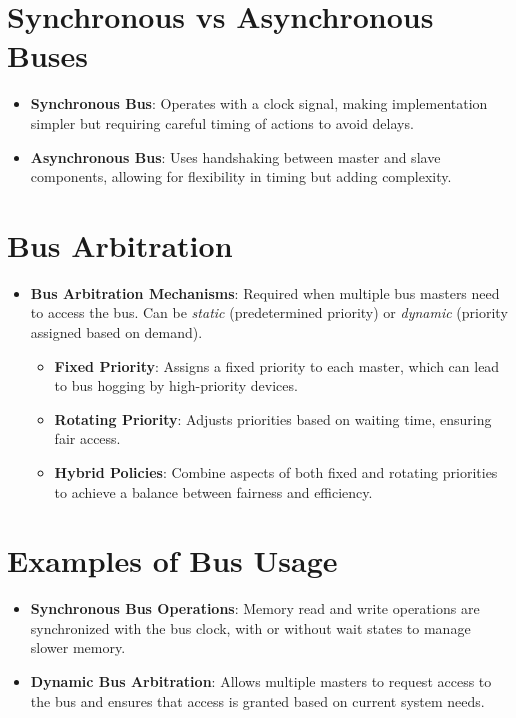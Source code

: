 \documentclass[
  14pt,
  a4paper,
  DIV=11,
  numbers=noendperiod,
  headinclude=true,
  footinclude=true]{scrreprt}
\providecommand{\tightlist}{%
  \setlength{\itemsep}{0pt}\setlength{\parskip}{0pt}}\usepackage{longtable,booktabs,array}
\begin{document}
\section{Synchronous vs Asynchronous
Buses}\label{synchronous-vs-asynchronous-buses}

\begin{itemize}
\tightlist
\item
  \textbf{Synchronous Bus}: Operates with a clock signal, making
  implementation simpler but requiring careful timing of actions to
  avoid delays.
\item
  \textbf{Asynchronous Bus}: Uses handshaking between master and slave
  components, allowing for flexibility in timing but adding complexity.
\end{itemize}

\section{Bus Arbitration}\label{bus-arbitration}

\begin{itemize}
\tightlist
\item
  \textbf{Bus Arbitration Mechanisms}: Required when multiple bus
  masters need to access the bus. Can be \emph{static} (predetermined
  priority) or \emph{dynamic} (priority assigned based on demand).

  \begin{itemize}
  \tightlist
  \item
    \textbf{Fixed Priority}: Assigns a fixed priority to each master,
    which can lead to bus hogging by high-priority devices.
  \item
    \textbf{Rotating Priority}: Adjusts priorities based on waiting
    time, ensuring fair access.
  \item
    \textbf{Hybrid Policies}: Combine aspects of both fixed and rotating
    priorities to achieve a balance between fairness and efficiency.
  \end{itemize}
\end{itemize}

\section{Examples of Bus Usage}\label{examples-of-bus-usage}

\begin{itemize}
\tightlist
\item
  \textbf{Synchronous Bus Operations}: Memory read and write operations
  are synchronized with the bus clock, with or without wait states to
  manage slower memory.
\item
  \textbf{Dynamic Bus Arbitration}: Allows multiple masters to request
  access to the bus and ensures that access is granted based on current
  system needs.
\end{itemize}
\end{document}
